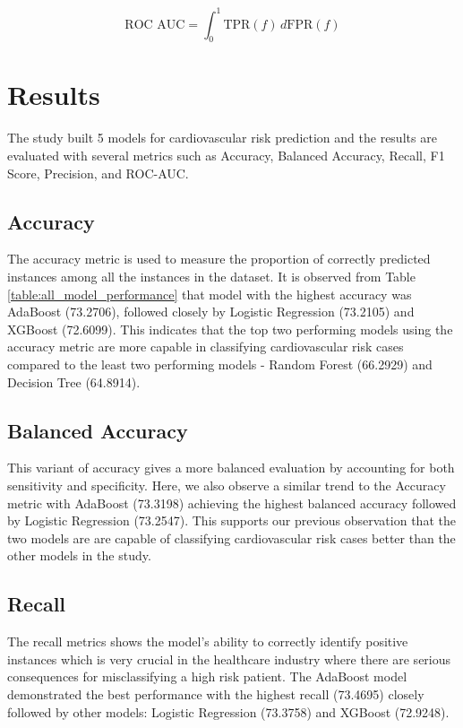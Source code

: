 \documentclass[12pt, a4paper,twoside]{report}
\numberwithin{equation}{chapter}
\begin{document}
\[
\text{ROC AUC} = \int_{0}^{1} \text{TPR}(f) \, d\text{FPR}(f)
\]


\chapter{Results}

The study built 5 models for cardiovascular risk prediction and the results are evaluated with several metrics such as Accuracy, Balanced Accuracy, Recall, F1 Score, Precision, and ROC-AUC.


\section{Accuracy}
The accuracy metric is used to measure the proportion of correctly predicted instances among all the instances in the dataset. It is observed from Table \ref{table:all_model_performance} that model with the highest accuracy was AdaBoost (73.2706), followed closely by Logistic Regression (73.2105) and XGBoost (72.6099). This indicates that the top two performing models using the accuracy metric are more capable in classifying cardiovascular risk cases compared to the least two performing models - Random Forest (66.2929) and Decision Tree (64.8914).

\section{Balanced Accuracy}

This variant of accuracy gives a more balanced evaluation by accounting for both sensitivity and specificity. Here, we also observe a similar trend to the Accuracy metric with AdaBoost (73.3198) achieving the highest balanced accuracy followed by Logistic Regression (73.2547). This supports our previous observation that the two models are are capable of classifying cardiovascular risk cases better than the other models in the study.


\section{Recall}

The recall metrics shows the model's ability to correctly identify positive instances which is very crucial in the healthcare industry where there are serious consequences for misclassifying a high risk patient. The AdaBoost model demonstrated the best performance with the highest recall (73.4695) closely followed by other models: Logistic Regression (73.3758) and XGBoost (72.9248).
\end{document}
